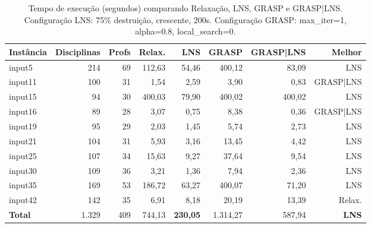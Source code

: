 \begin{table}[htbp]
\centering
\caption{Tempo de execução (segundos) comparando Relaxação, LNS, GRASP e GRASP|LNS. Configuração LNS: 75\% destruição, crescente, 200s. Configuração GRASP: max\_iter=1, alpha=0.8, local\_search=0.}
\label{tab:geral_tempo}
\small
\begin{tabular}{@{}lrrrrrrr@{}}
\toprule
\textbf{Instância} & \textbf{Disciplinas} & \textbf{Profs} & \textbf{Relax.} & \textbf{LNS} & \textbf{GRASP} & \textbf{GRASP|LNS} & \textbf{Melhor} \\
\midrule
input5  & 214 & 69 & 112,63 & 54,46  & 400,12 & 83,09 & LNS \\
input11 & 100 & 31 & 1,54   & 2,59   & 3,90   & 0,83 & GRASP|LNS \\
input15 & 94  & 30 & 400,03 & 79,90  & 400,02 & 400,02 & LNS \\
input16 & 89  & 28 & 3,07   & 0,75   & 8,38   & 0,36 & GRASP|LNS \\
input19 & 95  & 29 & 2,03   & 1,45   & 5,74   & 2,73 & LNS \\
input21 & 104 & 31 & 5,93   & 3,16   & 13,45  & 4,42 & LNS \\
input25 & 107 & 34 & 15,63  & 9,27   & 37,64  & 9,54 & LNS \\
input30 & 109 & 36 & 3,21   & 1,36   & 7,94   & 2,36 & LNS \\
input35 & 169 & 53 & 186,72 & 63,27  & 400,07 & 71,20 & LNS \\
input42 & 142 & 35 & 6,91   & 8,18   & 20,19  & 13,39 & Relax. \\
\midrule
\textbf{Total} & 1.329 & 409 & 744,13 & \textbf{230,05} & 1.314,27 & 587,94 & \textbf{LNS} \\
\bottomrule
\end{tabular}
\end{table}

